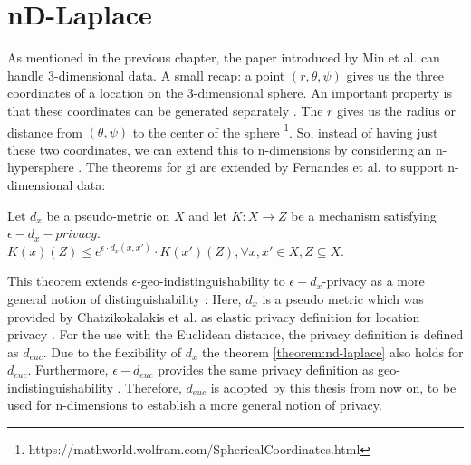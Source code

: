 \section{nD-Laplace}
As mentioned in the previous chapter, the paper introduced by Min et al. can handle 3-dimensional data.
A small recap: a point $(r, \theta, \psi)$ gives us the three coordinates of a location on the 3-dimensional sphere.
An important property is that these coordinates can be generated separately \citep{DBLP:journals/corr/abs-1212-1984, 9646489}.
The $r$ gives us the radius or distance from $(\theta, \psi)$ to the center of the sphere \footnote{https://mathworld.wolfram.com/SphericalCoordinates.html}.
So, instead of having just these two coordinates, we can extend this to n-dimensions by considering an n-hypersphere \citep{fernandes_generalised_2019, 9646489}.
The theorems for \gls{gi} are extended by Fernandes et al. to support n-dimensional data:
\begin{theorem}
  Let $d_x$ be a pseudo-metric on $X$ and let $K: X \rightarrow Z$ be a mechanism satisfying $\epsilon-d_x-privacy$. \\
  $K(x)(Z) \leq e^{\epsilon \cdot d_x (x, x')} \cdot K(x')(Z), \forall x, x' \in X, Z \subseteq X$.
  \label{theorem:nd-laplace}
\end{theorem}
This theorem extends $\epsilon$-geo-indistinguishability to $\epsilon-d_x$-privacy as a more general notion of distinguishability \citep{fernandes_generalised_2019}:
Here, $d_x$ is a pseudo metric which was provided by Chatzikokalakis et al. as elastic privacy definition for location privacy \citep{chatzikokolakis_constructing_2015}. For the use with the Euclidean distance, the privacy definition is defined as $d_{euc}$. Due to the flexibility of $d_x$ the theorem \ref{theorem:nd-laplace} also holds for $d_{euc}$.  Furthermore, $\epsilon-d_{euc}$ provides the same privacy definition as geo-indistinguishability \citep{chatzikokolakis_constructing_2015}. 
Therefore, $d_{euc}$ is adopted by this thesis from now on, to be used for n-dimensions to establish a more general notion of privacy. \newline

